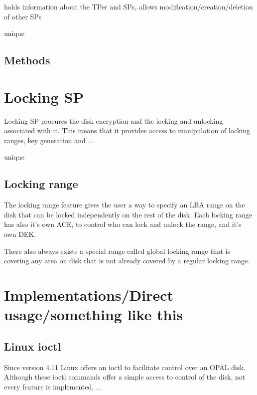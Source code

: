 holds information about the TPer and SPs, allows modification/creation/deletion of other SPs

unique

\subsection{Methods}

\section{Locking SP}

Locking SP procures the disk encryption and the locking and unlocking associated with it. This means that it provides access to manipulation of locking ranges, key generation and ...

unique

\subsection{Locking range}

The locking range feature gives the user a way to specify an LBA range on the disk that can be locked independently on the rest of the disk. Each locking range has also it's own ACE, to control who can lock and unlock the range, and it's own DEK.

There also always exists a special range called global locking range that is covering any area on disk that is not already covered by a regular locking range.

\section{Implementations/Direct usage/something like this}


\subsection{Linux ioctl}

Since version 4.11 Linux offers an ioctl to facilitate control over an OPAL disk. Although these ioctl commands offer a simple access to control of the disk, not every feature is implemented, ...


